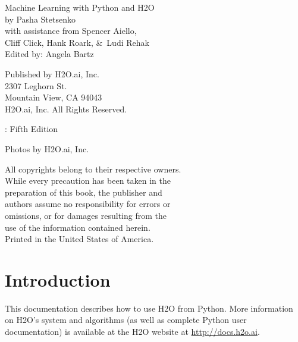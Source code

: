 \newpage
\restoregeometry

\null\vfill %

\thispagestyle{empty}%

{\raggedright 

Machine Learning with Python and H2O\\
  by Pasha Stetsenko \\
  with assistance from Spencer Aiello, \\
  Cliff Click, Hank Roark, \&\ Ludi Rehak \\
Edited by: Angela Bartz
\bigskip

Published by H2O.ai, Inc. \\
2307 Leghorn St. \\
Mountain View, CA 94043\\
\bigskip
\textcopyright \the\year \hspace{1pt} H2O.ai, Inc. All Rights Reserved. 
\bigskip

\monthname \hspace{1pt}  \the\year: Fifth Edition
\bigskip

Photos by \textcopyright H2O.ai, Inc.
\bigskip

All copyrights belong to their respective owners.\\
While every precaution has been taken in the\\
preparation of this book, the publisher and\\
authors assume no responsibility for errors or\\
omissions, or for damages resulting from the\\
use of the information contained herein.\\
\bigskip
Printed in the United States of America. 
}


\newpage
\thispagestyle{empty}%

\tableofcontents
\thispagestyle{empty}%

\newpage

\section{Introduction}

This documentation describes how to use H2O from Python. More information on H2O's system and algorithms
(as well as complete Python user documentation) is available at the H2O website at {\url{http://docs.h2o.ai}}.

